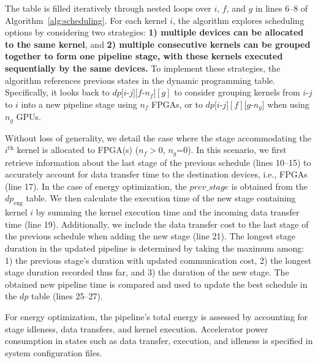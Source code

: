 The table is filled iteratively through nested loops over $i$, $f$, and $g$ in lines 6–8 of Algorithm~\ref{alg:scheduling}. For each kernel $i$, the algorithm explores scheduling options by considering two strategies: \textbf{1) multiple devices can be allocated to the same kernel}, and \textbf{2) multiple consecutive kernels can be grouped together to form one pipeline stage, with these kernels executed sequentially by the same devices.} To implement these strategies, the algorithm references previous states in the dynamic programming table. Specifically, it looks back to $dp[i $-$ j][f$-$n_f][g]$ to consider grouping kernels from $i $-$ j$ to $i$ into a new pipeline stage using $n_f$ FPGAs, or to $dp[i $-$ j][f][g $-$ n_g]$ when using $n_g$ GPUs. 

Without loss of generality, we detail the case where the stage accommodating the $i^\text{th}$ kernel is allocated to FPGA(s) ($n_f > 0$, $n_g $=$ 0$). In this scenario, we first retrieve information about the last stage of the previous schedule (lines 10–15) to accurately account for data transfer time to the destination devices, i.e., FPGAs (line 17). In the case of energy optimization, the $prev\_stage$ is obtained from the $dp_{\text{eng}}$ table. We then calculate the execution time of the new stage containing kernel $i$ by summing the kernel execution time and the incoming data transfer time (line 19). Additionally, we include the data transfer cost to the last stage of the previous schedule when adding the new stage (line 21). The longest stage duration in the updated pipeline is determined by taking the maximum among: 1) the previous stage's duration with updated communication cost, 2) the longest stage duration recorded thus far, and 3) the duration of the new stage. The obtained new pipeline time is compared and used to update the best schedule in the $dp$ table (lines 25–27).

For energy optimization, the pipeline’s total energy is assessed by accounting for stage idleness, data transfers, and kernel execution. Accelerator power consumption in states such as data transfer, execution, and idleness is specified in system configuration files.

